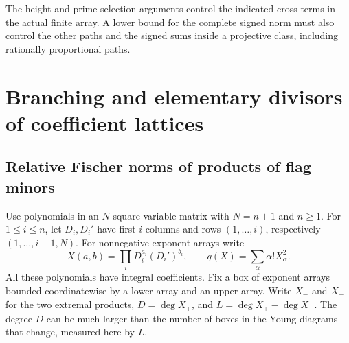 \documentclass[a4paper,11pt]{article}
\theoremstyle{definition}
\theoremstyle{remark}
\numberwithin{equation}{section}
\begin{document}
The height and prime selection arguments control the indicated
cross terms in the actual finite array. A lower bound for the
complete signed norm must also control the other paths and the
signed sums inside a projective class, including rationally
proportional paths.

\section{Branching and elementary divisors of coefficient lattices}\label{nav:chapter-coefficient-weyl-lattices}

\subsection{Relative Fischer norms of products of flag minors}\label{sec:commonfischer348}

Use polynomials in an \(N\)-square variable matrix with \(N=n+1\)
and \(n\ge1\). For \(1\le i\le n\), let \(D_i,D_i'\) have first
\(i\) columns and rows \((1,\ldots,i)\), respectively
\((1,\ldots,i-1,N)\). For nonnegative exponent arrays write
\[
       X(a,b)=\prod_iD_i^{a_i}(D_i')^{b_i},\qquad
       q(X)=\sum_\alpha \alpha! X_\alpha^2 .
\]
All these polynomials have integral coefficients. Fix a box of
exponent arrays bounded coordinatewise by a lower array and an
upper array. Write \(X_-\) and \(X_+\) for the two extremal
products, \(D=\deg X_+\), and \(L=\deg X_+-\deg X_-\).
The degree \(D\) can be much larger than the number of boxes in
the Young diagrams that change, measured here by \(L\).
\end{document}

